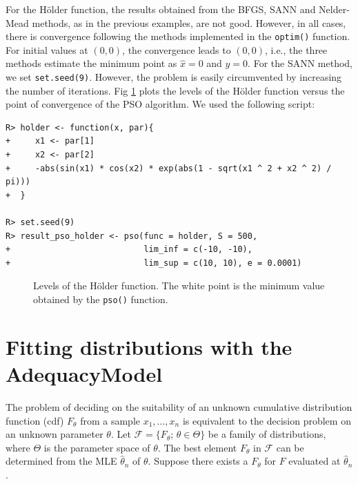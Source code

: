 \documentclass[10pt,letterpaper]{article}
\begin{document}
For the H\"{o}lder function, the results obtained from the BFGS, SANN and Nelder-Mead methods, as in the previous examples, are not good.
However, in all cases, there is convergence following the methods implemented in the \texttt{optim()} function.
For initial values at $(0, 0)$, the convergence leads to $(0, 0)$, i.e., the three methods estimate the minimum point as $\widehat{x} = 0$ and $\widehat{y} = 0$.
For the SANN method, we set \texttt{set.seed(9)}.
However, the problem is easily circumvented by increasing the number of iterations.
Fig \ref{curves_holder}  plots the levels of the H\"{o}lder function versus the point of convergence of the PSO algorithm.
We used the following script:
\begin{verbatim}
R> holder <- function(x, par){
+     x1 <- par[1]
+     x2 <- par[2]
+     -abs(sin(x1) * cos(x2) * exp(abs(1 - sqrt(x1 ^ 2 + x2 ^ 2) / pi)))
+  }

R> set.seed(9)
R> result_pso_holder <- pso(func = holder, S = 500,
+                           lim_inf = c(-10, -10),
+                           lim_sup = c(10, 10), e = 0.0001)
\end{verbatim}

\begin{figure}[H]
\centering
\caption{Levels of the H\"{o}lder function.
The white point is the minimum value obtained by the \texttt{pso()} function.}
\label{curves_holder}
\end{figure}


\section{Fitting distributions with the AdequacyModel}

The problem of deciding on the suitability of an unknown cumulative distribution function (cdf) $F_\theta$
from a sample $x_1,\ldots,x_n$ is equivalent to the decision problem on an unknown parameter $\theta$.
Let $\mathcal{F} = \{F_\theta;\,\theta \in \Theta \}$ be a family of distributions, where $\Theta$ is the parameter space of $\theta$.
The best element $F_{\theta}$ in $\mathcal{F}$ can be determined from the MLE $\widehat{\theta}_n$ of $\theta$.
Suppose there exists a $F_{\theta}$ for $F$ evaluated at $\widehat{\theta}_n$.
\end{document}
